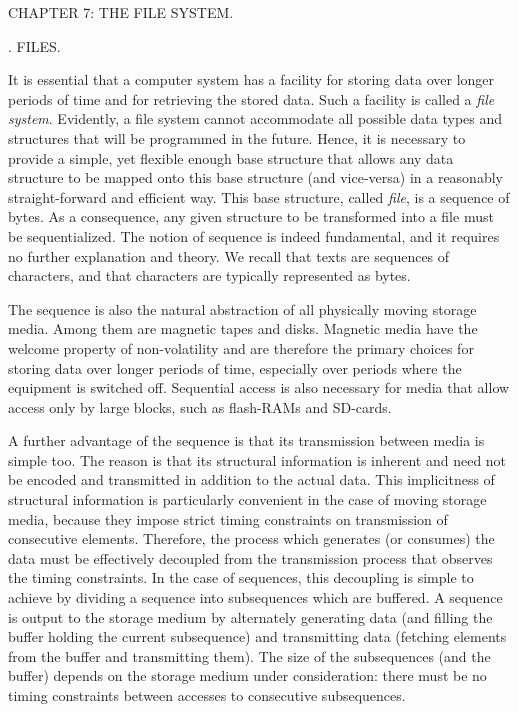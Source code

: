 \beginchapter CHAPTER 7: THE FILE SYSTEM.

. FILES.

It is essential that a computer system has a facility for storing data over longer periods of time and for retrieving the stored data. Such a facility is called a \emph{file system}. Evidently, a file system cannot accommodate all possible data types and structures that will be programmed in the future. Hence, it is necessary to provide a simple, yet flexible enough base structure that allows any data structure to be mapped onto this base structure (and vice-versa) in a reasonably straight-forward and efficient way. This base structure, called \emph{file}, is a sequence of bytes. As a consequence, any given structure to be transformed into a file must be sequentialized. The notion of sequence is indeed fundamental, and it requires no further explanation and theory. We recall that texts are sequences of characters, and that characters are typically represented as bytes.

The sequence is also the natural abstraction of all physically moving storage media. Among them are magnetic tapes and disks. Magnetic media have the welcome property of non-volatility and are therefore the primary choices for storing data over longer periods of time, especially over periods where the equipment is switched off. Sequential access is also necessary for media that allow access only by large blocks, such as flash-RAMs and SD-cards.

A further advantage of the sequence is that its transmission between media is simple too. The reason is that its structural information is inherent and need not be encoded and transmitted in addition to the actual data. This implicitness of structural information is particularly convenient in the case of moving storage media, because they impose strict timing constraints on transmission of consecutive elements. Therefore, the process which generates (or consumes) the data must be effectively decoupled from the transmission process that observes the timing constraints. In the case of sequences, this decoupling is simple to achieve by dividing a sequence into subsequences which are buffered. A sequence is output to the storage medium by alternately generating data (and filling the buffer holding the current subsequence) and transmitting data (fetching elements from the buffer and transmitting them). The size of the subsequences (and the buffer) depends on the storage medium under consideration: there must be no timing constraints between accesses to consecutive subsequences.

